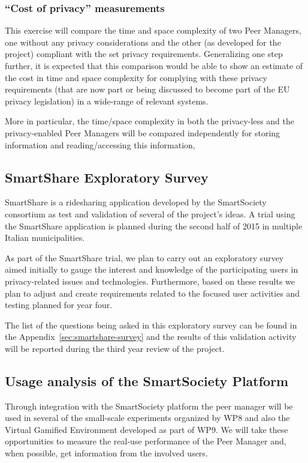 \subsubsection{``Cost of privacy'' measurements}
This exercise will compare the time and space complexity of two Peer Managers, one without any privacy considerations and the other (as developed for the project) compliant with the set privacy requirements. Generalizing one step further, it is expected that this comparison would be able to show an estimate of the cost in time and space complexity for complying with these privacy requirements (that are now part or being discussed to become part of the EU privacy legislation) in a wide-range of relevant systems.

More in particular, the time/space complexity in both the privacy-less and the privacy-enabled Peer Managers will be compared independently for storing information and reading/accessing this information, 

\subsection{SmartShare Exploratory Survey}
SmartShare is a ridesharing application developed by the SmartSociety consortium as test and validation of several of the project's ideas.  A trial using the SmartShare application is planned during the second half of 2015 in multiple Italian municipalities.  

As part of the SmartShare trial, we plan to carry out an exploratory survey aimed initially to gauge the interest and knowledge of the participating users in privacy-related issues and technologies. Furthermore, based on these results we plan to adjust and create requirements related to the focused user activities and testing planned for year four.
 
The list of the questions being asked in this exploratory survey can be found in the Appendix~\ref{sec:smartshare-survey} and the results of this validation activity will be reported during the third year review of the project.

\subsection{Usage analysis of the SmartSociety Platform}
Through integration with the SmartSociety platform the peer manager will be used in several of the small-scale experiments organized by WP8 and also the Virtual Gamified Environment developed as part of WP9. We will take these opportunities to measure the real-use performance of the Peer Manager and, when possible, get information from the involved users.

